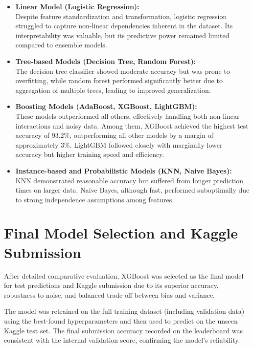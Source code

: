 \begin{itemize}
    \item \textbf{Linear Model (Logistic Regression):}\\
    Despite feature standardization and transformation, logistic regression struggled to capture non-linear dependencies inherent in the dataset.
    Its interpretability was valuable, but its predictive power remained limited compared to ensemble models.

    \item \textbf{Tree-based Models (Decision Tree, Random Forest):}\\
    The decision tree classifier showed moderate accuracy but was prone to overfitting, while random forest performed significantly better due to aggregation of multiple trees, leading to improved generalization.

    \item \textbf{Boosting Models (AdaBoost, XGBoost, LightGBM):}\\
    These models outperformed all others, effectively handling both non-linear interactions and noisy data.
    Among them, XGBoost achieved the highest test accuracy of 93.2\%, outperforming all other models by a margin of approximately 3\%.
    LightGBM followed closely with marginally lower accuracy but higher training speed and efficiency.

    \item \textbf{Instance-based and Probabilistic Models (KNN, Naive Bayes):}\\
    KNN demonstrated reasonable accuracy but suffered from longer prediction times on larger data.
    Naive Bayes, although fast, performed suboptimally due to strong independence assumptions among features.
\end{itemize}


\section{Final Model Selection and Kaggle Submission}\label{sec:final-model-selection-and-kaggle-submission}
After detailed comparative evaluation, XGBoost was selected as the final model for test predictions and Kaggle submission due to its superior accuracy, robustness to noise, and balanced trade-off between bias and variance.

The model was retrained on the full training dataset (including validation data) using the best-found hyperparameters and then used to predict on the unseen Kaggle test set.
The final submission accuracy recorded on the leaderboard was consistent with the internal validation score, confirming the model’s reliability.


